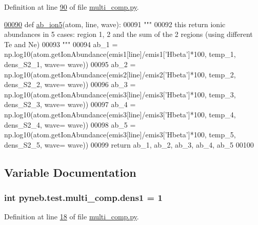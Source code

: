 Definition at line \hyperlink{multi__comp_8py_source_l00090}{90} of file \hyperlink{multi__comp_8py_source}{multi\+\_\+comp.\+py}.


\begin{DoxyCode}
\hypertarget{namespacepyneb_1_1test_1_1multi__comp_l00090}{}\hyperlink{namespacepyneb_1_1test_1_1multi__comp_a0a9d531b17c5ee87e8657bdad8f8d715}{00090} \textcolor{keyword}{def }\hyperlink{namespacepyneb_1_1test_1_1multi__comp_a0a9d531b17c5ee87e8657bdad8f8d715}{ab\_ion5}(atom, line, wave):
00091     \textcolor{stringliteral}{"""}
00092 \textcolor{stringliteral}{    this return ionic abundances in 5 cases: region 1, 2 and the sum of the 2 regions (using different Te
       and Ne)}
00093 \textcolor{stringliteral}{    """}
00094     ab\_1 = np.log10(atom.getIonAbundance(emis1[line]/emis1[\textcolor{stringliteral}{'Hbeta'}]*100, temp\_1, dens\_S2\_1, wave= wave))
00095     ab\_2 = np.log10(atom.getIonAbundance(emis2[line]/emis2[\textcolor{stringliteral}{'Hbeta'}]*100, temp\_2, dens\_S2\_2, wave= wave))
00096     ab\_3 = np.log10(atom.getIonAbundance(emis3[line]/emis3[\textcolor{stringliteral}{'Hbeta'}]*100, temp\_3, dens\_S2\_3, wave= wave))
00097     ab\_4 = np.log10(atom.getIonAbundance(emis3[line]/emis3[\textcolor{stringliteral}{'Hbeta'}]*100, temp\_4, dens\_S2\_4, wave= wave))
00098     ab\_5 = np.log10(atom.getIonAbundance(emis3[line]/emis3[\textcolor{stringliteral}{'Hbeta'}]*100, temp\_5, dens\_S2\_5, wave= wave))
00099     \textcolor{keywordflow}{return} ab\_1, ab\_2, ab\_3, ab\_4, ab\_5
00100 
\end{DoxyCode}


\subsection{Variable Documentation}
\hypertarget{namespacepyneb_1_1test_1_1multi__comp_a2078ba8e90b451762c3c912b5644b070}{}
\subsubsection[{dens1}]{\setlength{\rightskip}{0pt plus 5cm}int pyneb.\+test.\+multi\+\_\+comp.\+dens1 = 1}\label{namespacepyneb_1_1test_1_1multi__comp_a2078ba8e90b451762c3c912b5644b070}


Definition at line \hyperlink{multi__comp_8py_source_l00018}{18} of file \hyperlink{multi__comp_8py_source}{multi\+\_\+comp.\+py}.

